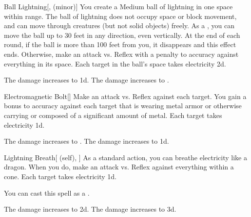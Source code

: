 \lowercase{\hypertarget{spell:Ball Lightning}{}}\label{spell:Ball Lightning}
\begin{freeability}[Rank 4]{\hypertarget{spell:Ball Lightning}{Ball Lightning}}[,  (minor)]
You create a Medium ball of lightning in one space within \rngmed range.
The ball of lightning does not occupy space or block movement, and can move through creatures (but not solid objects) freely.
As a , you can move the ball up to 30 feet in any direction, even vertically.
At the end of each round, if the ball is more than 100 feet from you, it disappears and this effect ends.
Otherwise, make an attack vs. Reflex with a  penalty to accuracy against everything in its space.
\hit Each target in the ball's space takes electricity  \minus2d.

\rankline
{} The damage increases to  \minus1d.
 The damage increases to .
\end{freeability}
\vspace{0.25em}



\lowercase{\hypertarget{spell:Electromagnetic Bolt}{}}\label{spell:Electromagnetic Bolt}
\begin{freeability}[Rank 4]{\hypertarget{spell:Electromagnetic Bolt}{Electromagnetic Bolt}}[]
Make an attack vs. Reflex against each target.
You gain a  bonus to accuracy against each target that is wearing metal armor or otherwise carrying or composed of a significant amount of metal.
\hit Each target takes electricity  \minus1d.

\rankline
{} The damage increases to .
 The damage increases to  \plus1d.
\end{freeability}
\vspace{0.25em}



\lowercase{\hypertarget{spell:Lightning Breath}{}}\label{spell:Lightning Breath}
\begin{attuneability}[Rank 4]{\hypertarget{spell:Lightning Breath}{Lightning Breath}}[ (self), ]
As a standard action, you can breathe electricity like a dragon.
When you do, make an attack vs. Reflex against everything within a \arealarge cone.
\hit Each target takes electricity  \plus1d.

You can cast this spell as a .

\rankline
{} The damage increases to  \plus2d.
 The damage increases to  \plus3d.
\end{attuneability}
\vspace{0.25em}




